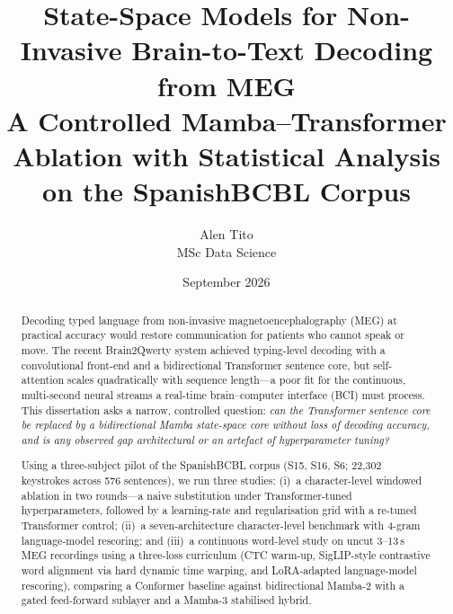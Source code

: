 \documentclass[11pt,a4paper]{report}
\title{\textbf{State-Space Models for Non-Invasive Brain-to-Text
Decoding from MEG}\\[6pt]
\large A Controlled Mamba--Transformer Ablation with Statistical
Analysis on the SpanishBCBL Corpus}
\author{Alen Tito\\MSc Data Science}
\date{September 2026}
\begin{document}
\maketitle

\begin{abstract}
\noindent
Decoding typed language from non-invasive magnetoencephalography (MEG) at
practical accuracy would restore communication for patients who cannot speak
or move. The recent Brain2Qwerty system achieved typing-level decoding with a
convolutional front-end and a bidirectional Transformer sentence core, but
self-attention scales quadratically with sequence length---a poor fit for the
continuous, multi-second neural streams a real-time brain--computer interface
(BCI) must process. This dissertation asks a narrow, controlled question:
\emph{can the Transformer sentence core be replaced by a bidirectional Mamba
state-space core without loss of decoding accuracy, and is any observed gap
architectural or an artefact of hyperparameter tuning?}

Using a three-subject pilot of the SpanishBCBL corpus (S15, S16, S6; 22{,}302
keystrokes across 576 sentences), we run three studies: (i)~a character-level
windowed ablation in two rounds---a naive substitution under
Transformer-tuned hyperparameters, followed by a learning-rate and
regularisation grid with a re-tuned Transformer control; (ii)~a
seven-architecture character-level benchmark with 4-gram language-model
rescoring; and (iii)~a continuous word-level study on uncut 3--13\,s MEG
recordings using a three-loss curriculum (CTC warm-up, SigLIP-style
contrastive word alignment via hard dynamic time warping, and LoRA-adapted
language-model rescoring), comparing a Conformer baseline against
bidirectional Mamba-2 with a gated feed-forward sublayer and a Mamba-3
stabilised hybrid.


\end{abstract}
\end{document}
